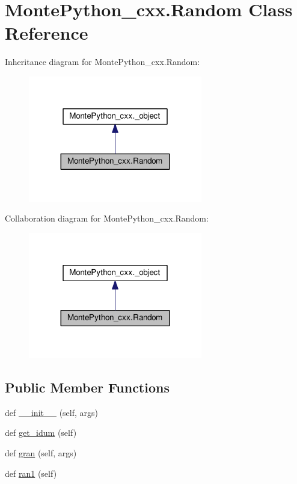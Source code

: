 \hypertarget{classMontePython__cxx_1_1Random}{}\section{Monte\+Python\+\_\+cxx.\+Random Class Reference}
\label{classMontePython__cxx_1_1Random}


Inheritance diagram for Monte\+Python\+\_\+cxx.\+Random\+:
\nopagebreak
\begin{figure}[H]
\begin{center}
\leavevmode
\includegraphics[width=215pt]{classMontePython__cxx_1_1Random__inherit__graph}
\end{center}
\end{figure}


Collaboration diagram for Monte\+Python\+\_\+cxx.\+Random\+:
\nopagebreak
\begin{figure}[H]
\begin{center}
\leavevmode
\includegraphics[width=215pt]{classMontePython__cxx_1_1Random__coll__graph}
\end{center}
\end{figure}
\subsection*{Public Member Functions}
\begin{DoxyCompactItemize}
\item 
def \hyperlink{classMontePython__cxx_1_1Random_ace28167eca591d6df01f1210d634c5ef}{\+\_\+\+\_\+init\+\_\+\+\_\+} (self, args)
\item 
def \hyperlink{classMontePython__cxx_1_1Random_a7ab843c767eeba7dbbc2ce880944c424}{get\+\_\+idum} (self)
\item 
def \hyperlink{classMontePython__cxx_1_1Random_a1fb61e1353f109f49683cdab9d9c599c}{gran} (self, args)
\item 
def \hyperlink{classMontePython__cxx_1_1Random_a58774267858fc29c21f32089546b67e0}{ran1} (self)
\end{DoxyCompactItemize}
